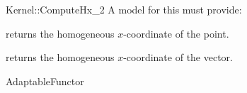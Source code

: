 \begin{ccRefFunctionObjectConcept}{Kernel::ComputeHx_2}
A model for this must provide:


       {returns the homogeneous $x$-coordinate of the point.}

       {returns the homogeneous $x$-coordinate of the vector.}

\ccRefines
AdaptableFunctor



\end{ccRefFunctionObjectConcept}

